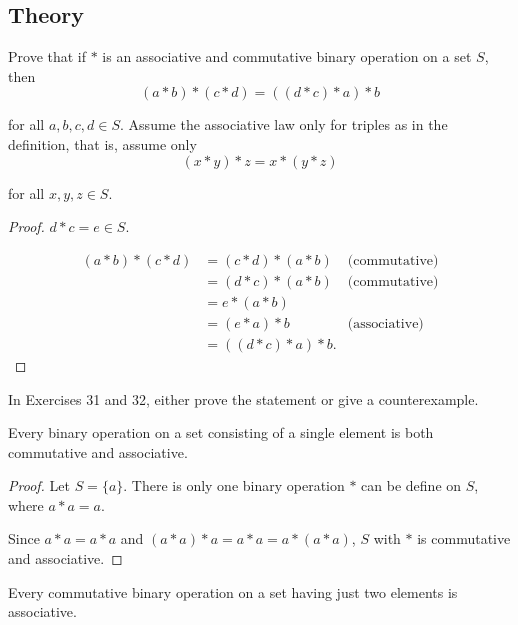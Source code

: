 \subsection*{Theory}

\begin{exercise}
    Prove that if $*$ is an associative and commutative binary operation on a set $S$, then
    \[
        (a * b) * (c * d) = ((d * c) * a) * b
    \]

    for all $a, b, c, d\in S$. Assume the associative law only for triples as in the definition, that is, assume only
    \[
        (x * y) * z = x * (y * z)
    \]

    for all $x, y, z\in S$.
\end{exercise}

\begin{proof}
    $d * c = e\in S$.

    \begin{align*}
        (a * b) * (c * d) & = (c * d) * (a * b)  & \text{(commutative)} \\
                          & = (d * c) * (a * b)  & \text{(commutative)} \\
                          & = e * (a * b)                               \\
                          & = (e * a) * b        & \text{(associative)} \\
                          & = ((d * c) * a) * b.
    \end{align*}
\end{proof}

In Exercises 31 and 32, either prove the statement or give a counterexample.

\begin{exercise}
    Every binary operation on a set consisting of a single element is both commutative and associative.
\end{exercise}

\begin{proof}
    Let $S = \{ a \}$. There is only one binary operation $*$ can be define on $S$, where $a * a = a$.

    Since $a * a = a * a$ and $(a * a) * a = a * a = a * (a * a)$, $S$ with $*$ is commutative and associative.
\end{proof}

\begin{exercise}
    Every commutative binary operation on a set having just two elements is associative.
\end{exercise}

